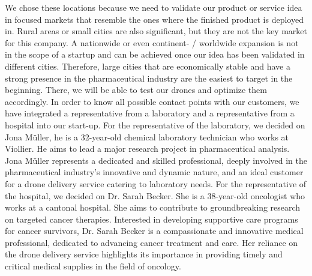 We chose these locations because we need to validate our product or service idea in focused markets that resemble the ones where the finished product is deployed in. Rural areas or small cities are also significant, but they are not the key market for this company. A nationwide or even continent- / worldwide expansion is not in the scope of a startup and can be achieved once our idea has been validated in different cities. Therefore, large cities that are economically stable and have a strong presence in the pharmaceutical industry are the easiest to target in the beginning. There, we will be able to test our drones and optimize them accordingly.
\newline
\newline
In order to know all possible contact points with our customers, we have integrated a representative from a laboratory and a representative from a hospital into our start-up.
\newline
\newline
For the representative of the laboratory, we decided on Jona Müller, he is a 32-year-old chemical laboratory technician who works at Viollier. He aims to lead a major research project in pharmaceutical analysis. Jona Müller represents a dedicated and skilled professional, deeply involved in the pharmaceutical industry's innovative and dynamic nature, and an ideal customer for a drone delivery service catering to laboratory needs.
\newline
\newline
For the representative of the hospital, we decided on Dr. Sarah Becker. She is a 38-year-old oncologist who works at a cantonal hospital. She aims to contribute to groundbreaking research on targeted cancer therapies. Interested in developing supportive care programs for cancer survivors, Dr. Sarah Becker is a compassionate and innovative medical professional, dedicated to advancing cancer treatment and care. Her reliance on the drone delivery service highlights its importance in providing timely and critical medical supplies in the field of oncology.